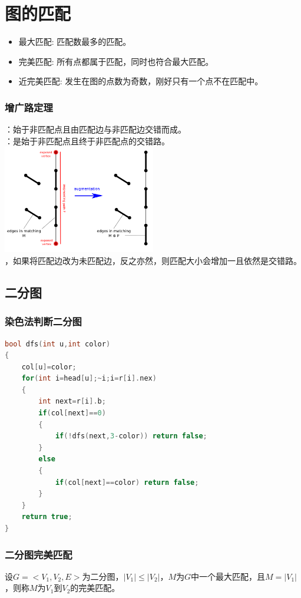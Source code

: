 \documentclass[a4paper]{book}
\begin{document}
\section{图的匹配}
\begin{itemize}
    \item 最大匹配: 匹配数最多的匹配。
    \item 完美匹配: 所有点都属于匹配，同时也符合最大匹配。
    \item 近完美匹配: 发生在图的点数为奇数，刚好只有一个点不在匹配中。
\end{itemize}
\subsubsection{增广路定理}
：始于非匹配点且由匹配边与非匹配边交错而成。\\
：是始于非匹配点且终于非匹配点的交错路。\\
\includegraphics[width=0.5\textwidth,center]{../photo/Berge's lemma}\\
，如果将匹配边改为未匹配边，反之亦然，则匹配大小会增加一且依然是交错路。
\subsection{二分图}
\subsubsection{染色法判断二分图}
\begin{lstlisting}[language=c++]
bool dfs(int u,int color)
{
    col[u]=color;
    for(int i=head[u];~i;i=r[i].nex)
    {
        int next=r[i].b;
        if(col[next]==0)
        {
            if(!dfs(next,3-color)) return false;
        }
        else
        {
            if(col[next]==color) return false;
        }
    }
    return true;
}
\end{lstlisting}
\subsubsection{二分图完美匹配}
设$G=<V_1,V_2,E>$为二分图，$|V_1|\leq|V_2|$，$M$为$G$中一个最大匹配，且$M=|V_1|$，则称$M$为$V_1$到$V_2$的完美匹配。
\end{document}

